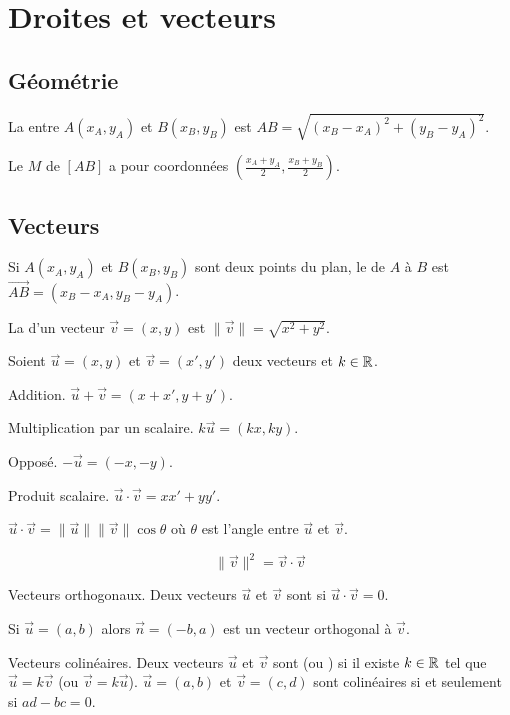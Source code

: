 \documentclass[10pt,class=article,crop=false]{standalone}
\begin{document}
\section{Droites et vecteurs}

\begin{multicols}{2}
	
\subsection{Géométrie}

La  entre $A(x_A,y_A)$ et $B(x_B,y_B)$ est $AB = \sqrt{(x_B-x_A)^2 + (y_B-y_A)^2}$.

Le  $M$ de $[AB]$ a pour coordonnées $\left( \frac{x_A+y_A}{2}, \frac{x_B+y_B}{2} \right)$.


\subsection{Vecteurs}

Si $A(x_A,y_A)$ et $B(x_B,y_B)$ sont deux points du plan, le  de $A$ à $B$ est $\vec{AB} = (x_B-x_A,y_B-y_A)$.

La  d'un vecteur $\vec v = (x,y)$ est $\|\vec v \| = \sqrt{x^2+y^2}$. 



Soient $\vec u = (x,y)$ et $\vec v = (x',y')$ deux vecteurs et $k \in \mathbb{R}$.

Addition. $\vec u + \vec v = (x+x',y+y')$.

Multiplication par un scalaire. $k\vec u = (kx,ky)$.

Opposé. $-\vec u = (-x,-y)$.

Produit scalaire. $\vec u \cdot \vec v = x x' + y y'$.

$\vec u \cdot \vec v = \| \vec u \| \| \vec v \| \cos \theta$ où $\theta$ est l'angle entre $\vec u$ et $\vec v$.

$$\| \vec v \|^2 = \vec v \cdot \vec v$$

Vecteurs orthogonaux. Deux vecteurs $\vec u$ et $\vec v$ sont  si $\vec u \cdot \vec v = 0$.

Si $\vec u = (a,b)$ alors $\vec n = (-b,a)$ est un vecteur orthogonal à $\vec v$.


Vecteurs colinéaires. Deux vecteurs $\vec u$ et $\vec v$ sont  (ou ) si 
il existe $k \in \mathbb{R}$ tel que $\vec u = k\vec v$ (ou $\vec v = k\vec u$).
$\vec u = (a,b)$ et $\vec v = (c,d)$ sont colinéaires
si et seulement si $ad - bc = 0$.


\end{multicols}
\end{document}
